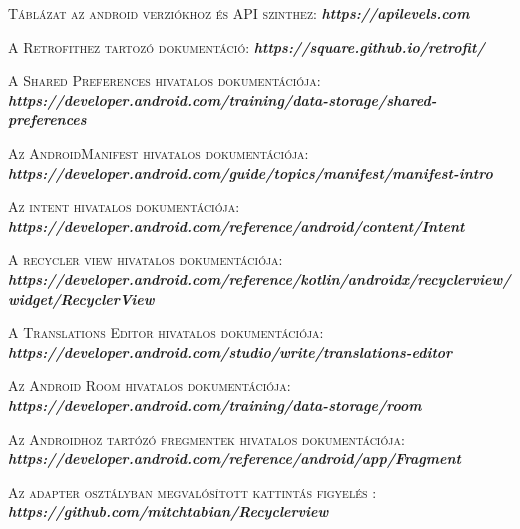 \documentclass[
]{thesis-ekf}
\theoremstyle{definition}
\theoremstyle{remark}
\begin{document}
\begin{thebibliography}{2}
		\textsc{Táblázat az android verziókhoz és API szinthez:}
		\newline
		\emph{\bf{https://apilevels.com}}
		
		\textsc{A Retrofithez tartozó dokumentáció:}
		\newline
		\emph{\bf{https://square.github.io/retrofit/}}
		
		\textsc{A Shared Preferences hivatalos dokumentációja:}
		\newline
		\emph{\bf{https://developer.android.com/training/data-storage/shared-preferences}}
		
		\textsc{Az AndroidManifest hivatalos dokumentációja:}
		\newline
		\emph{\bf{https://developer.android.com/guide/topics/manifest/manifest-intro}}
		
		\textsc{Az intent hivatalos dokumentációja:}
		\newline
		\emph{\bf{https://developer.android.com/reference/android/content/Intent}}
		
		\textsc{A recycler view hivatalos dokumentációja:}
		\newline
		\emph{\bf{https://developer.android.com/reference/kotlin/androidx/recyclerview/widget/RecyclerView}}
		
		\textsc{A Translations Editor hivatalos dokumentációja:}
		\newline
		\emph{\bf{https://developer.android.com/studio/write/translations-editor}}
		
		\textsc{Az Android Room hivatalos dokumentációja:}
		\newline
		\emph{\bf{https://developer.android.com/training/data-storage/room}}
		
		\textsc{Az Androidhoz tartózó fregmentek hivatalos dokumentációja:}
		\newline
		\emph{\bf{https://developer.android.com/reference/android/app/Fragment}}
		
		\textsc{Az adapter osztályban megvalósított kattintás figyelés :}
		\newline
		\emph{\bf{https://github.com/mitchtabian/Recyclerview}}
		
	\end{thebibliography}
	
	
\end{document}
